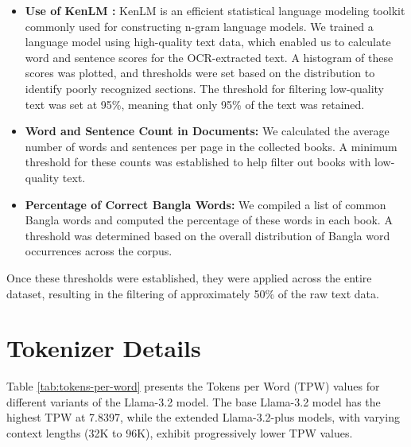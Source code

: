 \begin{itemize}[noitemsep,topsep=0pt,labelsep=.5em] 
\item \textbf{Use of KenLM \cite{heafield2011kenlm}:} KenLM is an efficient statistical language modeling toolkit commonly used for constructing n-gram language models. We trained a language model using high-quality text data, which enabled us to calculate word and sentence scores for the OCR-extracted text. A histogram of these scores was plotted, and thresholds were set based on the distribution to identify poorly recognized sections. The threshold for filtering low-quality text was set at 95\%, meaning that only 95\% of the text was retained.

    \item \textbf{Word and Sentence Count in Documents:} We calculated the average number of words and sentences per page in the collected books. A minimum threshold for these counts was established to help filter out books with low-quality text. 
    \item \textbf{Percentage of Correct Bangla Words:} We compiled a list of common Bangla words and computed the percentage of these words in each book. A threshold was determined based on the overall distribution of Bangla word occurrences across the corpus.
\end{itemize}

Once these thresholds were established, they were applied across the entire dataset, resulting in the filtering of approximately 50\% of the raw text data.

\section{Tokenizer Details}
Table \ref{tab:tokens-per-word} presents the Tokens per Word (TPW) values for different variants of the Llama-3.2 model. The base Llama-3.2 model has the highest TPW at 7.8397, while the extended Llama-3.2-plus models, with varying context lengths (32K to 96K), exhibit progressively lower TPW values. 

